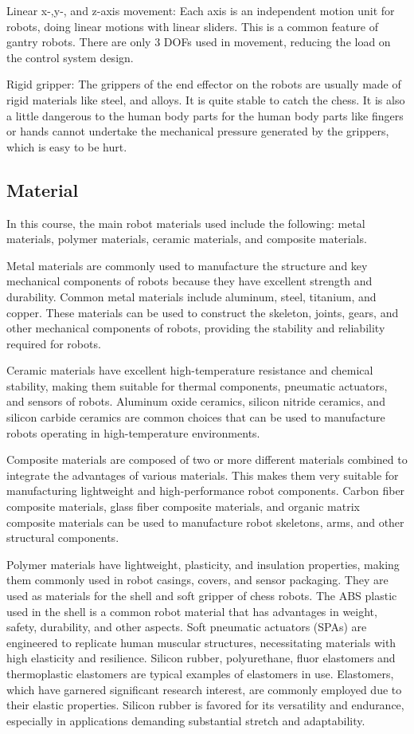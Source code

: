 \documentclass[10pt, a4paper, twocolumn]{article}
\begin{document}
Linear x-,y-, and z-axis movement: Each axis is an independent motion unit for robots, doing linear motions with linear sliders. This is a common feature of gantry robots. There are only 3 DOFs used in movement, reducing the load on the control system design.

Rigid gripper: The grippers of the end effector on the robots are usually made of rigid materials like steel, and alloys. It is quite stable to catch the chess. It is also a little dangerous to the human body parts for the human body parts like fingers or hands cannot undertake the mechanical pressure generated by the grippers, which is easy to be hurt.

\subsection{Material}
In this course, the main robot materials used include the following: metal materials, polymer materials, ceramic materials, and composite materials.

Metal materials are commonly used to manufacture the structure and key mechanical components of robots because they have excellent strength and durability. Common metal materials include aluminum, steel, titanium, and copper. These materials can be used to construct the skeleton, joints, gears, and other mechanical components of robots, providing the stability and reliability required for robots. 

Ceramic materials have excellent high-temperature resistance and chemical stability, making them suitable for thermal components, pneumatic actuators, and sensors of robots. Aluminum oxide ceramics, silicon nitride ceramics, and silicon carbide ceramics are common choices that can be used to manufacture robots operating in high-temperature environments. 

Composite materials are composed of two or more different materials combined to integrate the advantages of various materials. This makes them very suitable for manufacturing lightweight and high-performance robot components. Carbon fiber composite materials, glass fiber composite materials, and organic matrix composite materials can be used to manufacture robot skeletons, arms, and other structural components.

Polymer materials have lightweight, plasticity, and insulation properties, making them commonly used in robot casings, covers, and sensor packaging. They are used as materials for the shell and soft gripper of chess robots. The ABS plastic used in the shell is a common robot material that has advantages in weight, safety, durability, and other aspects. Soft pneumatic actuators (SPAs) are engineered to replicate human muscular structures, necessitating materials with high elasticity and resilience\cite{Rus2015}. Silicon rubber, polyurethane, fluor elastomers and thermoplastic elastomers are typical examples of elastomers in use.  Elastomers, which have garnered significant research interest\cite{Moseley2016}, are commonly employed due to their elastic properties. Silicon rubber is favored for its versatility and endurance, especially in applications demanding substantial stretch and adaptability\cite{Xavier2022}.
\end{document}
